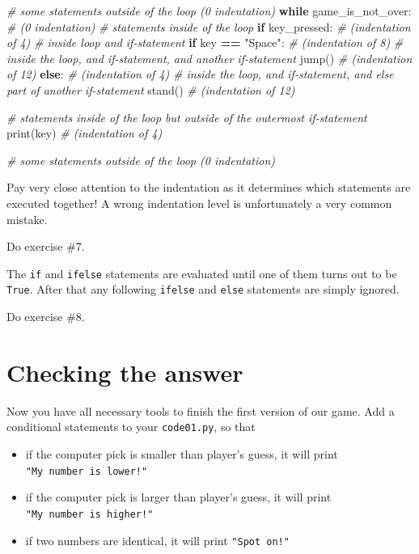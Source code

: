 \documentclass[
]{book}
\newenvironment{Shaded}{\begin{snugshade}}{\end{snugshade}}
\newcommand{\BuiltInTok}[1]{#1}
\newcommand{\CommentTok}[1]{\textcolor[rgb]{0.56,0.35,0.01}{\textit{#1}}}
\newcommand{\ControlFlowTok}[1]{\textcolor[rgb]{0.13,0.29,0.53}{\textbf{#1}}}
\newcommand{\NormalTok}[1]{#1}
\newcommand{\OperatorTok}[1]{\textcolor[rgb]{0.81,0.36,0.00}{\textbf{#1}}}
\newcommand{\StringTok}[1]{\textcolor[rgb]{0.31,0.60,0.02}{#1}}
\providecommand{\tightlist}{%
  \setlength{\itemsep}{0pt}\setlength{\parskip}{0pt}}
\begin{document}
\begin{Shaded}
\begin{Highlighting}[]
\CommentTok{\# some statements outside of the loop (0 indentation)}
\ControlFlowTok{while}\NormalTok{ game\_is\_not\_over: }\CommentTok{\# (0 indentation)}
    \CommentTok{\# statements inside of the loop }
    \ControlFlowTok{if}\NormalTok{ key\_pressed: }\CommentTok{\# (indentation of 4)}
        \CommentTok{\# inside loop and if{-}statement }
        \ControlFlowTok{if}\NormalTok{ key }\OperatorTok{==} \StringTok{"Space"}\NormalTok{: }\CommentTok{\# (indentation of 8)}
            \CommentTok{\# inside the loop, and if{-}statement, and another if{-}statement}
\NormalTok{            jump() }\CommentTok{\# (indentation of 12)}
        \ControlFlowTok{else}\NormalTok{: }\CommentTok{\# (indentation of 4)}
            \CommentTok{\# inside the loop, and if{-}statement, and else part of another if{-}statement}
\NormalTok{            stand() }\CommentTok{\# (indentation of 12)}
    
    \CommentTok{\# statements inside of the loop but outside of the outermost if{-}statement}
    \BuiltInTok{print}\NormalTok{(key) }\CommentTok{\# (indentation of 4)}
    
\CommentTok{\# some statements outside of the loop (0 indentation)}
\end{Highlighting}
\end{Shaded}

Pay very close attention to the indentation as it determines which statements are executed together! A wrong indentation level is unfortunately a very common mistake.

Do exercise \#7.

The \texttt{if} and \texttt{ifelse} statements are evaluated until one of them turns out to be \texttt{True}. After that any following \texttt{ifelse} and \texttt{else} statements are simply ignored.

Do exercise \#8.

\hypertarget{checking-the-answer}{%
\section{Checking the answer}\label{checking-the-answer}}

Now you have all necessary tools to finish the first version of our game. Add a conditional statements to your \texttt{code01.py}, so that

\begin{itemize}
\tightlist
\item
  if the computer pick is smaller than player's guess, it will print \texttt{"My\ number\ is\ lower!"}
\item
  if the computer pick is larger than player's guess, it will print \texttt{"My\ number\ is\ higher!"}
\item
  if two numbers are identical, it will print \texttt{"Spot\ on!"}
\end{itemize}
\end{document}
